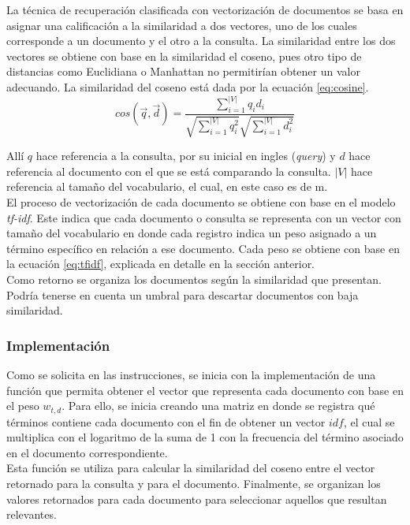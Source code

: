 La técnica de recuperación clasificada con vectorización de documentos se basa en asignar una calificación a la similaridad a dos vectores, uno de los cuales corresponde a un documento y el otro a la consulta. La similaridad entre los dos vectores se obtiene con base en la similaridad el coseno, pues otro tipo de distancias como Euclidiana o Manhattan no permitirían obtener un valor adecuando. La similaridad del coseno está dada por la ecuación \ref{eq:cosine}.
\begin{equation}
    cos(\vec{q}, \vec{d}) = \frac{\sum_{i=1}^{|V|}q_id_i}{\sqrt{\sum_{i=1}^{|V|}q_i^2} \sqrt{\sum_{i=1}^{|V|}d_i^2}}
    \label{eq:cosine}
\end{equation}

Allí $q$ hace referencia a la consulta, por su inicial en ingles (\textit{query}) y $d$ hace referencia al documento con el que se está comparando la consulta. $|V|$ hace referencia al tamaño del vocabulario, el cual, en este caso es de m.\\

El proceso de vectorización de cada documento se obtiene con base en el modelo \textit{tf-idf}. Este indica que cada documento o consulta se representa con un vector con tamaño del vocabulario en donde cada registro indica un peso asignado a un término específico en relación a ese documento. Cada peso se obtiene con base en la ecuación \ref{eq:tfidf}, explicada en detalle en la sección anterior. \\

Como retorno se organiza los documentos según la similaridad que presentan. Podría tenerse en cuenta un umbral para descartar documentos con baja similaridad.

\subsubsection{Implementación}
Como se solicita en las instrucciones, se inicia con la implementación de una función que permita obtener el vector que representa cada documento con base en el peso $w_{t,d}$. Para ello, se inicia creando una matriz en donde se registra qué términos contiene cada documento con el fin de obtener un vector $idf$, el cual se multiplica con el logaritmo de la suma de 1 con la frecuencia del término asociado en el documento correspondiente.\\

Esta función se utiliza para calcular la similaridad del coseno entre el vector retornado para la consulta y para el documento. Finalmente, se organizan los valores retornados para cada documento para seleccionar aquellos que resultan relevantes.